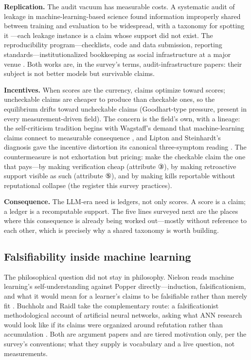 \documentclass[11pt,a4paper]{article}
\begin{document}
\textbf{Replication.} The audit vacuum has measurable costs. A systematic audit of leakage in machine-learning-based science found information improperly shared between training and evaluation to be widespread, with a taxonomy for spotting it \cite{key07}—each leakage instance is a claim whose support did not exist. The reproducibility program—checklists, code and data submission, reporting standards—institutionalized bookkeeping as social infrastructure at a major venue \cite{key08}. Both works are, in the survey's terms, audit-infrastructure papers: their subject is not better models but survivable claims.

\textbf{Incentives.} When scores are the currency, claims optimize toward scores; uncheckable claims are cheaper to produce than checkable ones, so the equilibrium drifts toward uncheckable claims (Goodhart-type pressure, present in every measurement-driven field). The concern is the field's own, with a lineage: the self-criticism tradition begins with Wagstaff's demand that machine-learning claims connect to measurable consequence \cite{key22}, and Lipton and Steinhardt's diagnosis gave the incentive distortion its canonical three-symptom reading \cite{key23}. The countermeasure is not exhortation but pricing: make the checkable claim the one that pays—by making verification cheap (attribute ③), by making retroactive support visible as such (attribute ⑤), and by making kills reportable without reputational collapse (the register this survey practices).

\textbf{Consequence.} The LLM-era need is ledgers, not only scores. A score is a claim; a ledger is a recomputable support. The five lines surveyed next are the places where this consequence is already being worked out—mostly without reference to each other, which is precisely why a shared taxonomy is worth building.

\subsection{Falsifiability inside machine learning}

The philosophical question did not stay in philosophy. Nielson reads machine learning's self-understanding against Popper directly—induction, falsificationism, and what it would mean for a learner's claims to be falsifiable rather than merely fit \cite{key24}. Buchholz and Raidl take the complementary route: a falsificationist methodological account of artificial neural networks, asking what ANN research would look like if its claims were organized around refutation rather than accumulation \cite{key25}. Both are argument papers and are tiered motivation only, per the survey's conventions; what they supply is vocabulary and a live question, not measurements.
\end{document}

